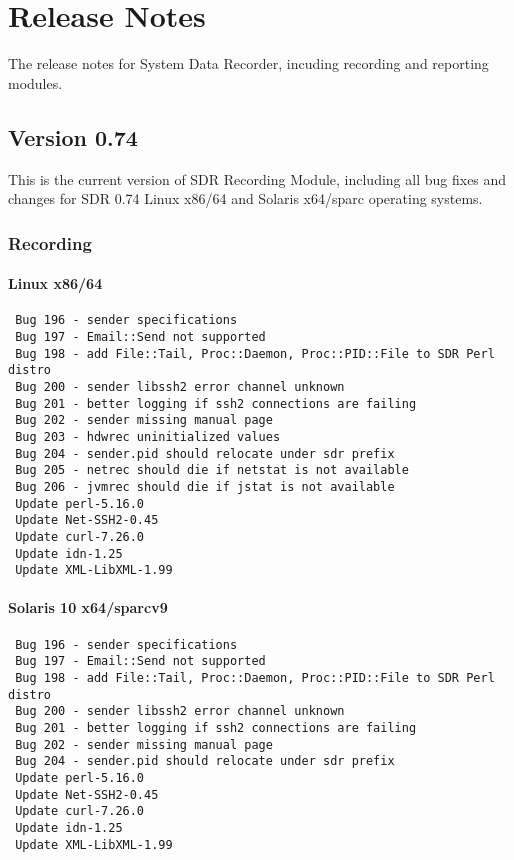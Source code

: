 
\chapter{Release Notes}
The release notes for System Data Recorder, incuding recording 
and reporting modules.


\section{Version 0.74}
\noindent
This is the current version of SDR Recording Module, including all bug 
fixes and changes for SDR 0.74 Linux x86/64 and Solaris x64/sparc 
operating systems. 

\subsection*{Recording}

\subsubsection*{Linux x86/64}
\begin{verbatim}
 Bug 196 - sender specifications
 Bug 197 - Email::Send not supported
 Bug 198 - add File::Tail, Proc::Daemon, Proc::PID::File to SDR Perl distro
 Bug 200 - sender libssh2 error channel unknown
 Bug 201 - better logging if ssh2 connections are failing
 Bug 202 - sender missing manual page
 Bug 203 - hdwrec uninitialized values
 Bug 204 - sender.pid should relocate under sdr prefix
 Bug 205 - netrec should die if netstat is not available
 Bug 206 - jvmrec should die if jstat is not available
 Update perl-5.16.0
 Update Net-SSH2-0.45
 Update curl-7.26.0
 Update idn-1.25
 Update XML-LibXML-1.99
\end{verbatim}

\subsubsection*{Solaris 10 x64/sparcv9}
\begin{verbatim}
 Bug 196 - sender specifications
 Bug 197 - Email::Send not supported
 Bug 198 - add File::Tail, Proc::Daemon, Proc::PID::File to SDR Perl distro
 Bug 200 - sender libssh2 error channel unknown
 Bug 201 - better logging if ssh2 connections are failing
 Bug 202 - sender missing manual page
 Bug 204 - sender.pid should relocate under sdr prefix
 Update perl-5.16.0
 Update Net-SSH2-0.45
 Update curl-7.26.0
 Update idn-1.25
 Update XML-LibXML-1.99
\end{verbatim}

